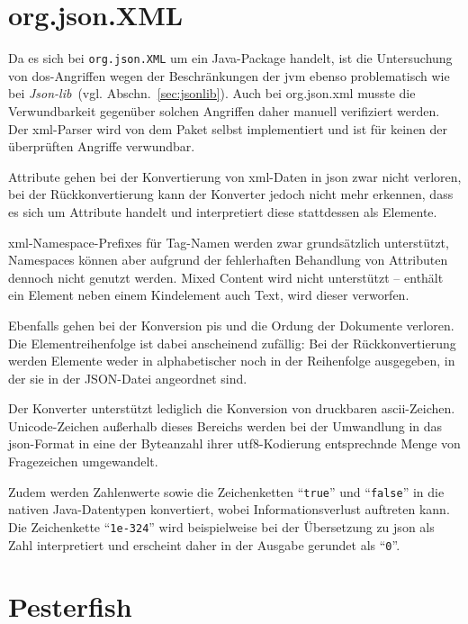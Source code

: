 \section{org.json.XML}
\label{sec:orgjsonxml}

Da es sich bei \texttt{org.json.XML} um ein Java-Package handelt, ist die Untersuchung von \acrshort{dos}-Angriffen wegen der Beschränkungen der \acrlong{jvm} ebenso problematisch wie bei \emph{Json-lib}~(vgl. Abschn.~\ref{sec:jsonlib}). Auch bei org.json.\acrshort{xml} musste die Verwundbarkeit gegenüber solchen Angriffen daher manuell verifiziert werden. Der \acrshort{xml}-Parser wird von dem Paket selbst implementiert und ist für keinen der überprüften Angriffe verwundbar.

Attribute gehen bei der Konvertierung von \acrshort{xml}-Daten in \acrshort{json} zwar nicht verloren, bei der Rückkonvertierung kann der Konverter jedoch nicht mehr erkennen, dass es sich um Attribute handelt und interpretiert diese stattdessen als Elemente.

\acrshort{xml}-Namespace-Prefixes für Tag-Namen werden zwar grundsätzlich unterstützt, Namespaces können aber aufgrund der fehlerhaften Behandlung von Attributen dennoch nicht genutzt werden.
 Mixed Content wird nicht unterstützt -- enthält ein Element neben einem Kindelement auch Text, wird dieser verworfen.

Ebenfalls gehen bei der Konversion \glspl{pi} und die Ordung der Dokumente verloren. Die Elementreihenfolge ist dabei anscheinend zufällig: Bei der Rückkonvertierung werden Elemente weder in alphabetischer noch in der Reihenfolge ausgegeben, in der sie in der JSON-Datei angeordnet sind.

Der Konverter unterstützt lediglich die Konversion von druckbaren \acrshort{ascii}-Zeichen. Unicode-Zeichen außerhalb dieses Bereichs werden bei der Umwandlung in das \acrshort{json}-Format in eine der Byteanzahl ihrer \acrshort{utf8}-Kodierung entsprechnde Menge von Fragezeichen umgewandelt.

Zudem werden Zahlenwerte sowie die Zeichenketten \enquote{\texttt{true}} und \enquote{\texttt{false}} in die nativen Java-Datentypen konvertiert, wobei Informationsverlust auftreten kann. Die Zeichenkette \enquote{\texttt{1e-324}} wird beispielweise bei der Übersetzung zu \acrshort{json} als Zahl interpretiert und erscheint daher in der Ausgabe gerundet als \enquote{\texttt{0}}.

\section{Pesterfish}
\label{sec:pesterfish}

